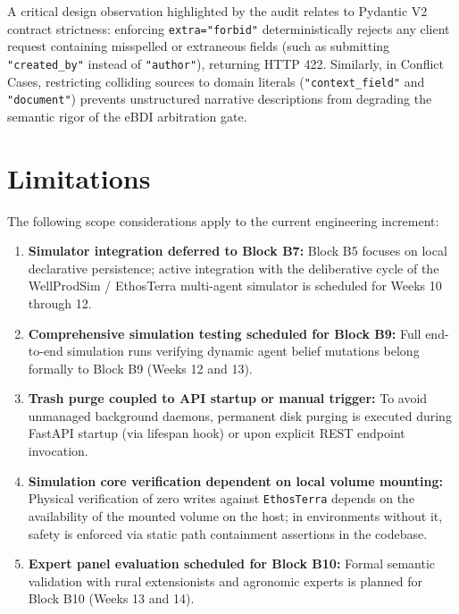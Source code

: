 \documentclass[11pt,a4paper]{article}
\begin{document}
A critical design observation highlighted by the audit relates to Pydantic V2 contract strictness: enforcing \texttt{extra="forbid"} deterministically rejects any client request containing misspelled or extraneous fields (such as submitting \texttt{"created\_by"} instead of \texttt{"author"}), returning HTTP 422. Similarly, in Conflict Cases, restricting colliding sources to domain literals (\texttt{"context\_field"} and \texttt{"document"}) prevents unstructured narrative descriptions from degrading the semantic rigor of the eBDI arbitration gate.

\section{Limitations}

The following scope considerations apply to the current engineering increment:
\begin{enumerate}[itemsep=2pt]
    \item \textbf{Simulator integration deferred to Block B7:} Block B5 focuses on local declarative persistence; active integration with the deliberative cycle of the WellProdSim / EthosTerra multi-agent simulator is scheduled for Weeks 10 through 12.
    \item \textbf{Comprehensive simulation testing scheduled for Block B9:} Full end-to-end simulation runs verifying dynamic agent belief mutations belong formally to Block B9 (Weeks 12 and 13).
    \item \textbf{Trash purge coupled to API startup or manual trigger:} To avoid unmanaged background daemons, permanent disk purging is executed during FastAPI startup (via lifespan hook) or upon explicit REST endpoint invocation.
    \item \textbf{Simulation core verification dependent on local volume mounting:} Physical verification of zero writes against \texttt{EthosTerra} depends on the availability of the mounted volume on the host; in environments without it, safety is enforced via static path containment assertions in the codebase.
    \item \textbf{Expert panel evaluation scheduled for Block B10:} Formal semantic validation with rural extensionists and agronomic experts is planned for Block B10 (Weeks 13 and 14).
\end{enumerate}
\end{document}
